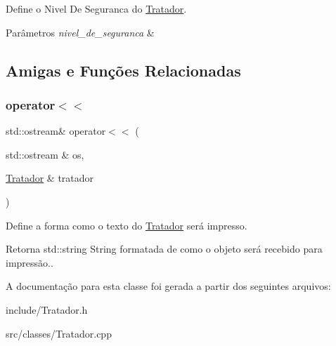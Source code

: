 Define o Nivel De Seguranca do \hyperlink{classTratador}{Tratador}. 


\begin{DoxyParams}{Parâmetros}
{\em nivel\+\_\+de\+\_\+seguranca} & \\
\hline
\end{DoxyParams}


\subsection{Amigas e Funções Relacionadas}
\mbox{\label{classTratador_af761ac4dd4aeeeddd1bcb83bdef6a4dd}} 
\subsubsection{\texorpdfstring{operator$<$$<$}{operator<<}}
{\footnotesize\ttfamily std\+::ostream\& operator$<$$<$ (\begin{DoxyParamCaption}\item[{std\+::ostream \&}]{os,  }\item[{\hyperlink{classTratador}{Tratador} \&}]{tratador }\end{DoxyParamCaption})\hspace{0.3cm}{\ttfamily [friend]}}



Define a forma como o texto do \hyperlink{classTratador}{Tratador} será impresso. 

\begin{DoxyReturn}{Retorna}
std\+::string String formatada de como o objeto será recebido para impressão.. 
\end{DoxyReturn}


A documentação para esta classe foi gerada a partir dos seguintes arquivos\+:\begin{DoxyCompactItemize}
\item 
include/Tratador.\+h\item 
src/classes/Tratador.\+cpp\end{DoxyCompactItemize}
